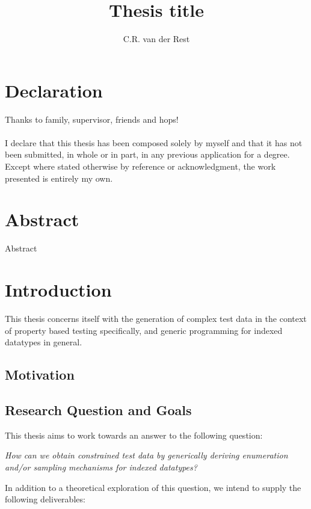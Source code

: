 \documentclass[a4paper,msc,twosized=semi]{uustthesis}
\title{Thesis title}
\author{C.R. van der Rest}
\begin{document}
\maketitle

\frontmatter
\tableofcontents

\chapter{Declaration}
Thanks to family, supervisor, friends and hops!
\\ \\
I declare that this thesis has been composed solely by myself and that it has not been
submitted, in whole or in part, in any previous application for a degree. Except where
stated otherwise by reference or acknowledgment, the work presented is entirely my
own.

\chapter{Abstract}
Abstract

\mainmatter

\chapter{Introduction}
This thesis concerns itself with the generation of complex test data in the context of property based testing specifically, and generic programming for indexed datatypes in general. 

\section{Motivation}

\section{Research Question and Goals}

  This thesis aims to work towards an answer to the following question: 

  \begin{center} \emph{
    How can we obtain constrained test data by generically deriving enumeration and/or sampling mechanisms for indexed datatypes?
  }\end{center}

  In addition to a theoretical exploration of this question, we intend to supply the following deliverables:
\end{document}
